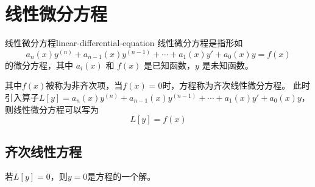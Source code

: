 \documentclass[math]{amznotes}
\begin{document}
\setlength{\parindent}{2em}
\setcounter{tocdepth}{2} %
\tableofcontents
\newpage
\chapter{线性微分方程}
\begin{dfnbox}{线性微分方程}{linear-differential-equation}
    线性微分方程是指形如
    \begin{equation*}
        a_n(x)y^{(n)} + a_{n-1}(x)y^{(n-1)} + \cdots + a_1(x)y' + a_0(x)y = f(x)
    \end{equation*}
    的微分方程，其中 $a_i(x)$ 和 $f(x)$ 是已知函数，$y$ 是未知函数。
\end{dfnbox}
其中$f(x)$被称为非齐次项，当$f(x) = 0$时，方程称为齐次线性微分方程。
此时引入算子$L[y] = a_n(x)y^{(n)} + a_{n-1}(x)y^{(n-1)} + \cdots + a_1(x)y' + a_0(x)y$，则线性微分方程可以写为
\begin{equation*}
    L[y] = f(x)
\end{equation*}
\section{齐次线性方程}
若$L[y] = 0$，则$y = 0$是方程的一个解。
\end{document}
